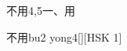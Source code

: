 \begin{entry}{不用}{4,5}{⼀、⽤}
  \begin{phonetics}{不用}{bu2 yong4}[][HSK 1]
  \end{phonetics}
\end{entry}
